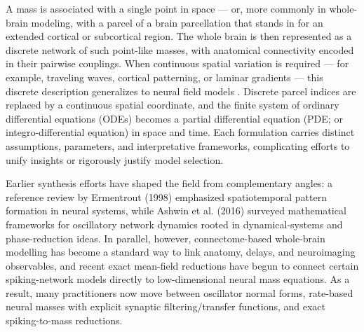 \documentclass[12pt]{article}
\numberwithin{equation}{section}
\newcommand{\rev}[1]{\begingroup\color{navyblue}#1\endgroup}
\begin{document}
  \rev{A mass is associated with a single point in space — or, more commonly in whole-brain modeling, with a parcel of a brain parcellation that stands in for an extended cortical or subcortical region. The whole brain is then represented as a discrete network of such point-like masses, with anatomical connectivity encoded in their pairwise couplings. When continuous spatial variation is required — for example, traveling waves, cortical patterning, or laminar gradients — this discrete description generalizes to neural field models \cite{coombes2014}. Discrete parcel indices are replaced by a continuous spatial coordinate, and 
  the finite system of ordinary differential equations (ODEs) becomes a partial differential equation (PDE; or integro-differential equation)
  in space and time.} Each formulation carries distinct assumptions, parameters, and interpretative frameworks, complicating efforts to unify insights or rigorously justify model selection.

\rev{Earlier synthesis efforts have shaped the field from complementary angles: a reference review by  Ermentrout  (1998) \cite{ermentrout1998neural} emphasized spatiotemporal pattern formation in neural systems, while Ashwin et al. (2016) \cite{ashwin2016mathematical} surveyed mathematical frameworks for oscillatory network dynamics rooted in dynamical-systems and phase-reduction ideas. In parallel, however, connectome-based whole-brain modelling has become a standard way to link anatomy, delays, and neuroimaging observables, and recent exact mean-field reductions have begun to connect certain spiking-network models directly to low-dimensional neural mass equations. As a result, many practitioners now move between oscillator normal forms, rate-based neural masses with explicit synaptic filtering/transfer functions, and exact spiking-to-mass reductions. }
\end{document}
